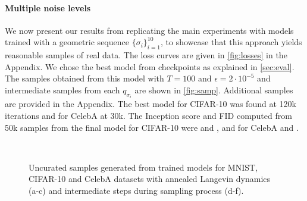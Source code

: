 \paragraph{Multiple noise levels} We now present our results from replicating the main experiments with models trained with a geometric sequence $\{\sigma_i\}_{i=1}^{10}$, to showcase that this approach yields reasonable samples of real data. The loss curves are given in \autoref{fig:losses} in the Appendix. We chose the best model from checkpoints as explained in \autoref{sec:eval}. The samples obtained from this model with $T=100$ and $\epsilon=2 \cdot 10^{-5}$ and intermediate samples from each $q_{\sigma_i}$ are shown in \autoref{fig:samp}. Additional samples are provided in the Appendix. The best model for CIFAR-10 was found at 120k iterations and for CelebA at 30k. The Inception score and FID computed from 50k samples from the final model for CIFAR-10 were  and , and for CelebA  and .

\begin{figure}[h!]
  \centering
     \hspace{2mm}
     \hspace{2mm}
      \\
     \hspace{2mm}
     \hspace{2mm}
     
     \caption{Uncurated samples generated from trained models for MNIST, CIFAR-10 and CelebA datasets with annealed Langevin dynamics (a-c) and intermediate steps during sampling process (d-f).}
     \label{fig:samples}
\end{figure}

